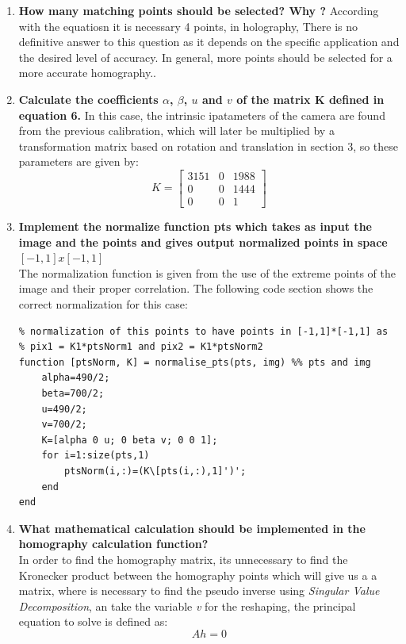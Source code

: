 \documentclass[12pt, twoside]{report}
\begin{document}
\begin{enumerate}
    \item \textbf{How many matching points should be selected? Why ?}
    According with the equatiosn it is necessary 4 points, in holography, 
There is no definitive answer to this question as it depends on the specific application and the desired level of accuracy. In general, more points should be selected for a more accurate homography..

    
    \item \textbf{Calculate the coefficients $\alpha$, $\beta$, $u$ and $v$ of the matrix K defined in equation 6.}
    In this case, the intrinsic ipatameters of the camera are found from the previous calibration, which will later be multiplied by a transformation matrix based on rotation and translation in section 3, so these parameters are given by:
    \begin{equation}
    K=
        \begin{bmatrix}
3151 & 0 & 1988\\
0 & 0 & 1444\\
0 & 0 & 1
\end{bmatrix}
    \end{equation}
    \item \textbf{Implement the normalize function pts which takes as input the image and the points and gives output normalized points in space $[-1,1 ] x [-1,1 ]$}\\
The normalization function is given from the use of the extreme points of the image and their proper correlation. The following code section shows the correct normalization for this case:
\begin{lstlisting}
% normalization of this points to have points in [-1,1]*[-1,1] as 
% pix1 = K1*ptsNorm1 and pix2 = K1*ptsNorm2
function [ptsNorm, K] = normalise_pts(pts, img) %% pts and img
    alpha=490/2;
    beta=700/2;
    u=490/2;
    v=700/2;
    K=[alpha 0 u; 0 beta v; 0 0 1];
    for i=1:size(pts,1)
        ptsNorm(i,:)=(K\[pts(i,:),1]')';
    end
end 
\end{lstlisting}

    \item \textbf{What mathematical calculation should be implemented in the homography calculation function?}\\
    In order to find the homography matrix, its unnecessary to find the Kronecker product between the homography points which will give us a a matrix, where is necessary to find the pseudo inverse using \textit{Singular Value Decomposition}, an take the variable \textit{v} for the reshaping, the principal equation to solve is defined as:\\
    \begin{equation}
        Ah=0
    \end{equation}
    

\end{enumerate}
\end{document}
